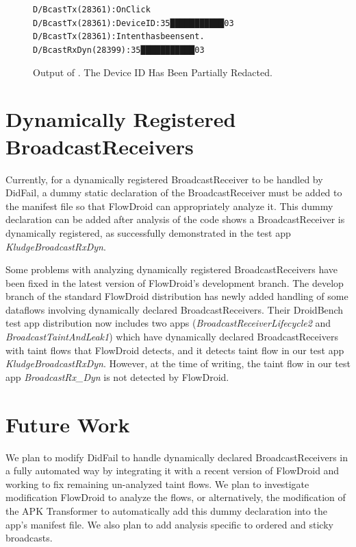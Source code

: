\begin{figure}[!h]
\begin{framed}
\begin{alltt}
D/BcastTx (28361): OnClick
D/BcastTx (28361): DeviceID: 35███████████03
D/BcastTx (28361): Intent has been sent.
D/BcastRxDyn(28399): 35███████████03
\end{alltt}
\caption[Output of ]{Output of .  The Device ID Has Been Partially Redacted.}
\label{fig:logcat-BcastDyn}
\end{framed}
\end{figure}

\section{Dynamically Registered BroadcastReceivers}
Currently, for a dynamically registered BroadcastReceiver to be handled by DidFail, a dummy static declaration of the BroadcastReceiver must be added to the manifest file so that FlowDroid can appropriately analyze it. This dummy declaration can be added after analysis of the code shows a BroadcastReceiver is dynamically registered, as successfully demonstrated in the test app \textit{KludgeBroadcastRxDyn}.

Some problems with analyzing dynamically registered BroadcastReceivers have been fixed in the latest version of FlowDroid’s development branch. The develop branch of the standard FlowDroid distribution has newly added handling of some dataflows involving dynamically declared BroadcastReceivers. Their DroidBench test app distribution now includes two apps (\textit{BroadcastReceiverLifecycle2} and \textit{BroadcastTaintAndLeak1}) which have dynamically declared BroadcastReceivers with taint flows that FlowDroid detects, and it detects taint flow in our test app \textit{KludgeBroadcastRxDyn}. However, at the time of writing, the taint flow in our test app \textit{BroadcastRx\_Dyn} is not detected by FlowDroid.

\section{Future Work}
We plan to modify DidFail to handle dynamically declared BroadcastReceivers in a fully automated way by integrating it with a recent version of FlowDroid and working to fix remaining un-analyzed taint flows. We plan to investigate modification FlowDroid to analyze the flows, or alternatively, the modification of the APK Transformer to automatically add this dummy declaration into the app’s manifest file. We also plan to add analysis specific to ordered and sticky broadcasts.


